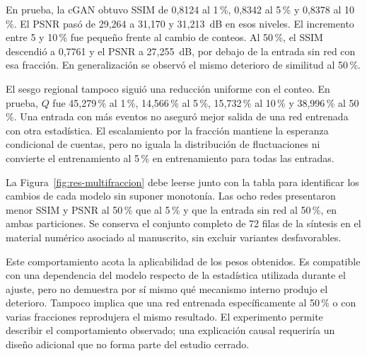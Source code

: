 En prueba, la cGAN obtuvo SSIM de 0,8124 al 1\,\%, 0,8342 al 5\,\% y 0,8378 al 10\,\%. El PSNR pasó de 29,264 a 31,170 y 31,213~dB en esos niveles. El incremento entre 5 y 10\,\% fue pequeño frente al cambio de conteos. Al 50\,\%, el SSIM descendió a 0,7761 y el PSNR a 27,255~dB, por debajo de la entrada sin red con esa fracción. En generalización se observó el mismo deterioro de similitud al 50\,\%.

El sesgo regional tampoco siguió una reducción uniforme con el conteo. En prueba, $Q$ fue 45,279\,\% al 1\,\%, 14,566\,\% al 5\,\%, 15,732\,\% al 10\,\% y 38,996\,\% al 50\,\%. Una entrada con más eventos no aseguró mejor salida de una red entrenada con otra estadística. El escalamiento por la fracción mantiene la esperanza condicional de cuentas, pero no iguala la distribución de fluctuaciones ni convierte el entrenamiento al 5\,\% en entrenamiento para todas las entradas.

La Figura~\ref{fig:res-multifraccion} debe leerse junto con la tabla para identificar los cambios de cada modelo sin suponer monotonía. Las ocho redes presentaron menor SSIM y PSNR al 50\,\% que al 5\,\% y que la entrada sin red al 50\,\%, en ambas particiones. Se conserva el conjunto completo de 72 filas de la síntesis en el material numérico asociado al manuscrito, sin excluir variantes desfavorables.

Este comportamiento acota la aplicabilidad de los pesos obtenidos. Es compatible con una dependencia del modelo respecto de la estadística utilizada durante el ajuste, pero no demuestra por sí mismo qué mecanismo interno produjo el deterioro. Tampoco implica que una red entrenada específicamente al 50\,\% o con varias fracciones reprodujera el mismo resultado. El experimento permite describir el comportamiento observado; una explicación causal requeriría un diseño adicional que no forma parte del estudio cerrado.

